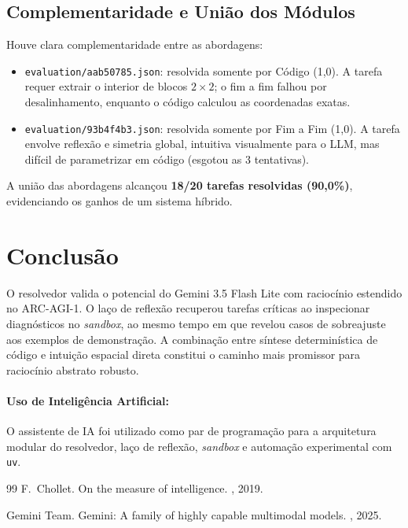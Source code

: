 \documentclass{article}
\begin{document}
\subsection{Complementaridade e União dos Módulos}
Houve clara complementaridade entre as abordagens:
\begin{itemize}
    \item \texttt{evaluation/aab50785.json}: resolvida somente por Código (1,0). A tarefa requer extrair o interior de blocos $2\times2$; o fim a fim falhou por desalinhamento, enquanto o código calculou as coordenadas exatas.
    \item \texttt{evaluation/93b4f4b3.json}: resolvida somente por Fim a Fim (1,0). A tarefa envolve reflexão e simetria global, intuitiva visualmente para o LLM, mas difícil de parametrizar em código (esgotou as 3 tentativas).
\end{itemize}
A união das abordagens alcançou \textbf{18/20 tarefas resolvidas (90,0\%)}, evidenciando os ganhos de um sistema híbrido.

\section{Conclusão}

O resolvedor valida o potencial do Gemini 3.5 Flash Lite com raciocínio estendido no ARC-AGI-1. O laço de reflexão recuperou tarefas críticas ao inspecionar diagnósticos no \textit{sandbox}, ao mesmo tempo em que revelou casos de sobreajuste aos exemplos de demonstração. A combinação entre síntese determinística de código e intuição espacial direta constitui o caminho mais promissor para raciocínio abstrato robusto.

\paragraph{Uso de Inteligência Artificial:} O assistente de IA foi utilizado como par de programação para a arquitetura modular do resolvedor, laço de reflexão, \textit{sandbox} e automação experimental com \texttt{uv}.

\footnotesize
\begin{thebibliography}{99}
\setlength{\itemsep}{0pt}
\setlength{\parskip}{0pt}
F.~Chollet.
\newblock On the measure of intelligence.
, 2019.

{Gemini Team}.
\newblock Gemini: A family of highly capable multimodal models.
, 2025.
\end{thebibliography}
\end{document}
